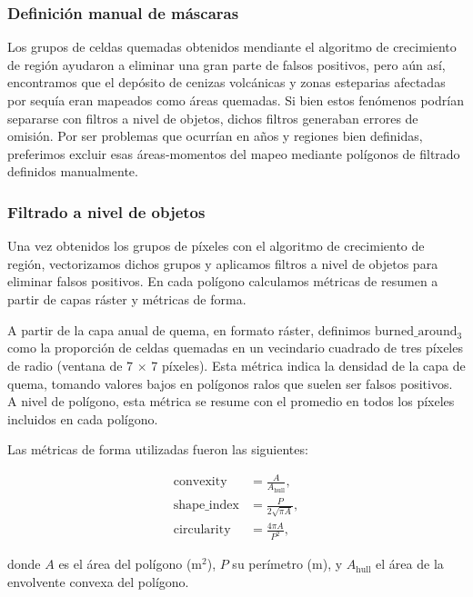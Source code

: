 \documentclass[11pt,a4paper]{article}
\begin{document}
\FloatBarrier

\subsubsection{Definición manual de máscaras}

Los grupos de celdas quemadas obtenidos mendiante el algoritmo de crecimiento de región ayudaron a eliminar una gran parte de falsos positivos, pero aún así, encontramos que el depósito de cenizas volcánicas y zonas esteparias afectadas por sequía eran mapeados como áreas quemadas. Si bien estos fenómenos podrían separarse con filtros a nivel de objetos, dichos filtros generaban errores de omisión. Por ser problemas que ocurrían en años y regiones bien definidas, preferimos excluir esas áreas-momentos del mapeo mediante polígonos de filtrado definidos manualmente.

\subsubsection{Filtrado a nivel de objetos}

Una vez obtenidos los grupos de píxeles con el algoritmo de crecimiento de región, vectorizamos dichos grupos y aplicamos filtros a nivel de objetos para eliminar falsos positivos. En cada polígono calculamos métricas de resumen a partir de capas ráster y métricas de forma. 

A partir de la capa anual de quema, en formato ráster, definimos $\mathrm{burned\_around}_3$ como la proporción de celdas quemadas en un vecindario cuadrado de tres píxeles de radio (ventana de 7 $\times$ 7 píxeles). Esta métrica indica la densidad de la capa de quema, tomando valores bajos en polígonos ralos que suelen ser falsos positivos. A nivel de polígono, esta métrica se resume con el promedio en todos los píxeles incluidos en cada polígono.

Las métricas de forma utilizadas fueron las siguientes:

\[
\begin{aligned}
\mathrm{convexity} &=
\frac{A}{A_{\mathrm{hull}}}, \\[6pt]
\mathrm{shape\_index} &=
\frac{P}{2 \sqrt{\pi A}}, \\[6pt]
\mathrm{circularity} &=
\frac{4 \pi A}{P^2},
\end{aligned}
\]

\noindent donde $A$ es el área del polígono ($\text{m}^2$), $P$ su perímetro ($\text{m}$), y $A_{\mathrm{hull}}$ el área de la envolvente convexa del polígono.
\end{document}
